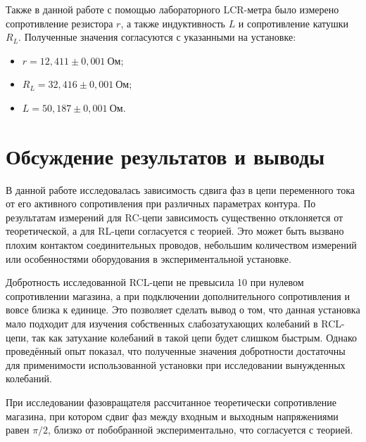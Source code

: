 \documentclass[a4paper, 12pt]{article}
\begin{document}
Также в данной работе с помощью лабораторного LCR-метра было измерено сопротивление резистора $r$, а также индуктивность $L$ и сопротивление катушки $R_L$. Полученные значения согласуются с указанными на установке:
\begin{itemize}
\item $r = 12,411\pm0,001~Ом$;
\item $R_L = 32,416\pm0,001~Ом$;
\item $L = 50,187\pm0,001~Ом$.
\end{itemize}

\section{Обсуждение результатов и выводы}

В данной работе исследовалась зависимость сдвига фаз в цепи переменного тока от его активного сопротивления при различных параметрах контура. По результатам измерений для RC-цепи зависимость существенно отклоняется от теоретической, а для RL-цепи согласуется с теорией. Это может быть вызвано плохим контактом соединительных проводов, небольшим количеством измерений или особенностями оборудования в экспериментальной установке.

Добротность исследованной RCL-цепи не превысила 10 при нулевом сопротивлении магазина, а при подключении дополнительного сопротивления и вовсе близка к единице. Это позволяет сделать вывод о том, что данная установка мало подходит для изучения собственных слабозатухающих колебаний в RCL-цепи, так как затухание колебаний в такой цепи будет слишком быстрым. Однако проведённый опыт показал, что полученные значения добротности достаточны для применимости использованной установки при исследовании вынужденных колебаний.

При исследовании фазовращателя рассчитанное теоретически сопротивление магазина, при котором сдвиг фаз между входным и выходным напряжениями равен $\pi/2$, близко от побобранной экспериментально, что согласуется с теорией.
\end{document}
